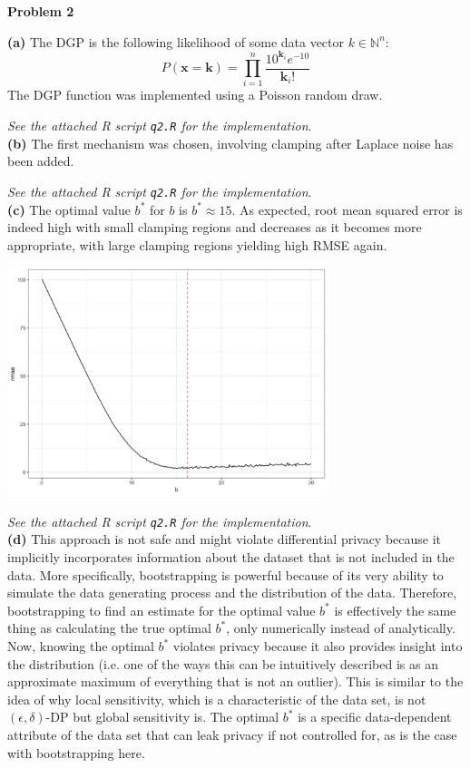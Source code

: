 \documentclass[12pt]{article}
\begin{document}
\pagebreak

{\large\textbf{Problem 2}}

\textbf{(a)} The DGP is the following likelihood of some data vector $k\in\mathbb{N}^n$:
\[P(\mathbf{x} = \mathbf{k}) = \prod\limits^n_{i=1} \dfrac{10^{\mathbf{k}_i}e^{-10}}{\mathbf{k}_i!}\]
The DGP function was implemented using a Poisson random draw.

\emph{See the attached R script \texttt{q2.R} for the implementation}.\\

\textbf{(b)} The first mechanism was chosen, involving clamping after Laplace noise has been added.

\emph{See the attached R script \texttt{q2.R} for the implementation}.\\

\textbf{(c)} The optimal value $b^*$ for $b$ is $\boxed{b^* \approx 15}$. As expected, root mean squared error is indeed high with small clamping regions and decreases as it becomes more appropriate, with large clamping regions yielding high RMSE again.

\begin{center}
\includegraphics[width=0.7\textwidth]{clamping}
\end{center}

\emph{See the attached R script \texttt{q2.R} for the implementation}.\\

\textbf{(d)} This approach is not safe and might violate differential privacy because it implicitly incorporates information about the dataset that is not included in the data. More specifically, bootstrapping is powerful because of its very ability to simulate the data generating process and the distribution of the data. Therefore, bootstrapping to find an estimate for the optimal value $b^*$ is effectively the same thing as calculating the true optimal $b^*$, only numerically instead of analytically. Now, knowing the optimal $b^*$ violates privacy because it also provides insight into the distribution (i.e. one of the ways this can be intuitively described is as an approximate maximum of everything that is not an outlier). This is similar to the idea of why local sensitivity, which is a characteristic of the data set, is not $(\epsilon, \delta)$-DP but global sensitivity is. The optimal $b^*$ is a specific data-dependent attribute of the data set that can leak privacy if not controlled for, as is the case with bootstrapping here.\\
\end{document}
